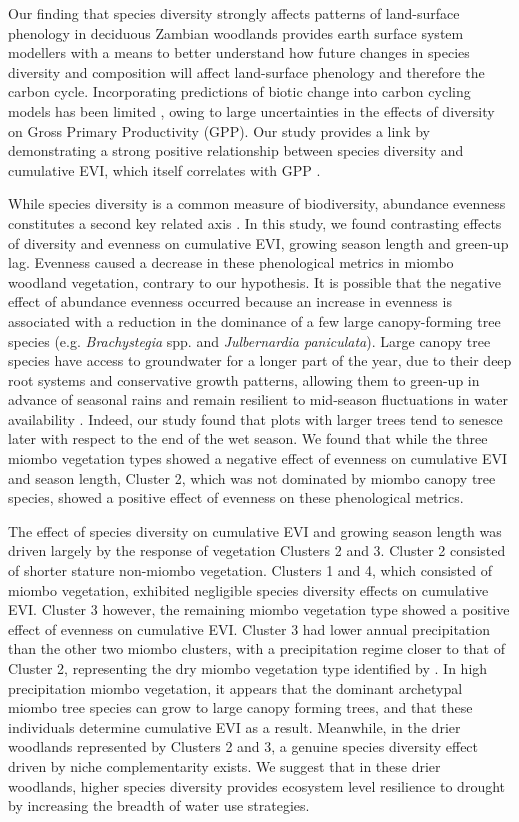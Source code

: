 \begin{refsection}
Our finding that species diversity strongly affects patterns of land-surface phenology in deciduous Zambian woodlands provides earth surface system modellers with a means to better understand how future changes in species diversity and composition will affect land-surface phenology and therefore the carbon cycle. Incorporating predictions of biotic change into carbon cycling models has been limited \citep{Ahlstrom2015, Bodegom2011}, owing to large uncertainties in the effects of diversity on Gross Primary Productivity (GPP). Our study provides a link by demonstrating a strong positive relationship between species diversity and cumulative EVI, which itself correlates with GPP \citep{Sjostrom2011}.

While species diversity is a common measure of biodiversity, abundance evenness constitutes a second key related axis \citep{Wilsey2005, Hillebrand2008, Jost2010}. In this study, we found contrasting effects of diversity and evenness on cumulative EVI, growing season length and green-up lag. Evenness caused a decrease in these phenological metrics in miombo woodland vegetation, contrary to our hypothesis. It is possible that the negative effect of abundance evenness occurred because an increase in evenness is associated with a reduction in the dominance of a few large canopy-forming tree species (e.g. \textit{Brachystegia} spp. and \textit{Julbernardia paniculata}). Large canopy tree species have access to groundwater for a longer part of the year, due to their deep root systems and conservative growth patterns, allowing them to green-up in advance of seasonal rains and remain resilient to mid-season fluctuations in water availability \citep{Zhou2020}. Indeed, our study found that plots with larger trees tend to senesce later with respect to the end of the wet season. We found that while the three miombo vegetation types showed a negative effect of evenness on cumulative EVI and season length, Cluster 2, which was not dominated by miombo canopy tree species, showed a positive effect of evenness on these phenological metrics. 

The effect of species diversity on cumulative EVI and growing season length was driven largely by the response of vegetation Clusters 2 and 3. Cluster 2 consisted of shorter stature non-miombo vegetation. Clusters 1 and 4, which consisted of miombo vegetation, exhibited negligible species diversity effects on cumulative EVI. Cluster 3 however, the remaining miombo vegetation type showed a positive effect of evenness on cumulative EVI. Cluster 3 had lower annual precipitation than the other two miombo clusters, with a precipitation regime closer to that of Cluster 2, representing the dry miombo vegetation type identified by \citet{White1983}. In high precipitation miombo vegetation, it appears that the dominant archetypal miombo tree species can grow to large canopy forming trees, and that these individuals determine cumulative EVI as a result. Meanwhile, in the drier woodlands represented by Clusters 2 and 3, a genuine species diversity effect driven by niche complementarity exists. We suggest that in these drier woodlands, higher species diversity provides ecosystem level resilience to drought by increasing the breadth of water use strategies. 


\end{refsection}
